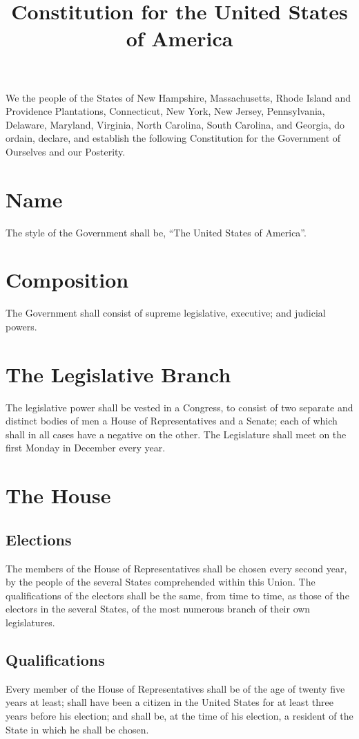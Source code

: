 \documentclass{constitution}
\title{Constitution for the United States of America}
\begin{document}
\maketitle
\tableofcontents*

\preamble
We the people of the States of New Hampshire, Massachusetts, Rhode Island and Providence Plantations, Connecticut, New York, New Jersey, Pennsylvania, Delaware, Maryland, Virginia, North Carolina, South Carolina, and Georgia,
do ordain, declare, and establish the following Constitution for the Government of Ourselves and our Posterity.

\chapter{Name}
The style of the Government shall be, “The United States of America”.

\chapter{Composition}
The Government shall consist of supreme legislative, executive; and judicial powers.

\chapter{The Legislative Branch}
The legislative power shall be vested in a Congress,
to consist of two separate and distinct bodies of men
a House of Representatives and a Senate;
each of which shall in all cases have a negative on the other.
The Legislature shall meet on the first Monday in December every year.

\chapter{The House}
\section{Elections}
The members of the House of Representatives shall be chosen every second year,
by the people of the several States comprehended within this Union.
The qualifications of the electors shall be the same, from time to time,
as those of the electors in the several States,
of the most numerous branch of their own legislatures.

\section{Qualifications}
Every member of the House of Representatives shall be of the age of twenty five years at least;
shall have been a citizen in the United States for at least three years before his election;
and shall be, at the time of his election, a resident of the State in which he shall be chosen.
\end{document}
